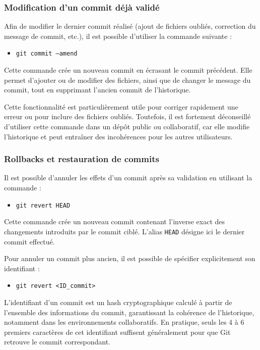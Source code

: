 \documentclass{article}
\begin{document}
\subsubsection{Modification d’un commit déjà validé}

Afin de modifier le dernier commit réalisé (ajout de fichiers oubliés, correction du message de commit, etc.), il est possible d’utiliser la commande suivante :
\begin{itemize}
    \item \texttt{git commit --amend}
\end{itemize}
Cette commande crée un nouveau commit en écrasant le commit précédent. Elle permet d’ajouter ou de modifier des fichiers, ainsi que de changer le message du commit, tout en supprimant l’ancien commit de l’historique.

Cette fonctionnalité est particulièrement utile pour corriger rapidement une erreur ou pour inclure des fichiers oubliés. Toutefois, il est fortement déconseillé d’utiliser cette commande dans un dépôt public ou collaboratif, car elle modifie l’historique et peut entraîner des incohérences pour les autres utilisateurs.

\subsubsection{Rollbacks et restauration de commits}

Il est possible d’annuler les effets d’un commit après sa validation en utilisant la commande :
\begin{itemize}
    \item \texttt{git revert HEAD}
\end{itemize}
Cette commande crée un nouveau commit contenant l’inverse exact des changements introduits par le commit ciblé. L’alias \texttt{HEAD} désigne ici le dernier commit effectué.

Pour annuler un commit plus ancien, il est possible de spécifier explicitement son identifiant :
\begin{itemize}
    \item \texttt{git revert \textless{}ID\_commit\textgreater{}}
\end{itemize}

L’identifiant d’un commit est un hash cryptographique calculé à partir de l’ensemble des informations du commit, garantissant la cohérence de l’historique, notamment dans les environnements collaboratifs. En pratique, seuls les 4 à 6 premiers caractères de cet identifiant suffisent généralement pour que Git retrouve le commit correspondant.
\end{document}
